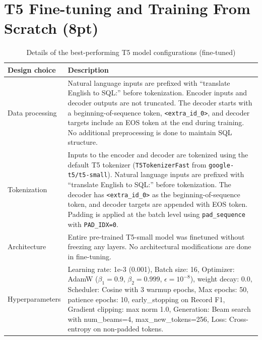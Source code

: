 \documentclass{article}
\begin{document}
\newpage




\section{T5 Fine-tuning and Training From Scratch (8pt)}\label{sec:t5}

\begin{table}[h!]
\centering
\begin{tabular}{p{3.5cm}p{10cm}}
\toprule
Design choice & Description \\
\midrule
Data processing & Natural language inputs are prefixed with ``translate English to SQL:'' before tokenization. Encoder inputs and decoder outputs are not truncated. The decoder starts with a beginning-of-sequence token, \texttt{<extra\_id\_0>}, and decoder targets include an EOS token at the end during training. No additional preprocessing is done to maintain SQL structure. \\
Tokenization & Inputs to the encoder and decoder are tokenized using the default T5 tokenizer (\texttt{T5TokenizerFast} from \texttt{google-t5/t5-small}). Natural language inputs are prefixed with ``translate English to SQL:'' before tokenization. The decoder has \texttt{<extra\_id\_0>} as the beginning-of-sequence token, and decoder targets are appended with EOS token. Padding is applied at the batch level using \texttt{pad\_sequence} with \texttt{PAD\_IDX=0}. \\
Architecture & Entire pre-trained T5-small model was finetuned without freezing any layers. No architectural modifications are done in fine-tuning. \\
Hyperparameters & Learning rate: 1e-3 (0.001), Batch size: 16, Optimizer: AdamW ($\beta_1{=}0.9$, $\beta_2{=}0.999$, $\epsilon{=}10^{-8}$), weight decay: 0.0, Scheduler: Cosine with 3 warmup epochs, Max epochs: 50, patience epochs: 10, early\_stopping on Record F1, Gradient clipping: max norm 1.0, Generation: Beam search with num\_beams=4, max\_new\_tokens=256, Loss: Cross-entropy on non-padded tokens. \\
\bottomrule
\end{tabular}
\caption{Details of the best-performing T5 model configurations (fine-tuned)}
\label{tab:t5_results_ft}
\end{table}
\end{document}
